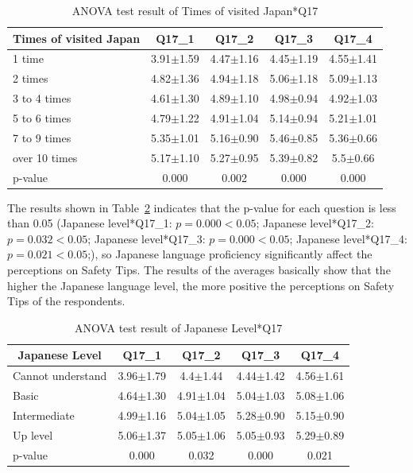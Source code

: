 \begin{table}[h]
  \caption{ANOVA test result of Times of visited Japan*Q17}
  \label{table32c}
  \centering
  \begin{tabular}{l|cccc}
 \hline
        \multicolumn{1}{c|}{Times of visited Japan}          & Q17\_1               & Q17\_2 & Q17\_3    & Q17\_4       \\
\hline
1 time        & 3.91$\pm$1.59 & 4.47$\pm$1.16   & 4.45$\pm$1.19   & 4.55$\pm$1.41 \\
2 times       & 4.82$\pm$1.36 & 4.94$\pm$1.18  & 5.06$\pm$1.18   & 5.09$\pm$1.13 \\
3 to 4 times  & 4.61$\pm$1.30 & 4.89$\pm$1.10 & 4.98$\pm$0.94 & 4.92$\pm$1.03  \\
5 to 6 times  & 4.79$\pm$1.22 & 4.91$\pm$1.04 & 5.14$\pm$0.94 & 5.21$\pm$1.01 \\
7 to 9 times  & 5.35$\pm$1.01 & 5.16$\pm$0.90 & 5.46$\pm$0.85 & 5.36$\pm$0.66 \\
over 10 times & 5.17$\pm$1.10& 5.27$\pm$0.95 & 5.39$\pm$0.82 & 5.5$\pm$0.66 \\           
\hline
p-value&           0.000&         0.002&         0.000&   0.000   \\
 \hline
  \end{tabular}
\end{table}


The results shown in Table~\ref{table32d} indicates that the p-value for each question is less than 0.05 (Japanese level*Q17\_1: $p=0.000<0.05$; Japanese level*Q17\_2: $p=0.032<0.05$; Japanese level*Q17\_3: $p=0.000<0.05$; Japanese level*Q17\_4: $p=0.021<0.05$;), so Japanese language proficiency significantly affect the perceptions on Safety Tips. The results of the averages basically show that the higher the Japanese language level, the more positive the perceptions on Safety Tips of the respondents. 



\begin{table}[h]
  \caption{ANOVA test result of Japanese Level*Q17}
  \label{table32d}
  \centering
  \begin{tabular}{l|cccc}
 \hline
        \multicolumn{1}{c|}{Japanese Level}          & Q17\_1               & Q17\_2 & Q17\_3    & Q17\_4        \\
\hline
Cannot understand & 3.96$\pm$1.79& 4.4$\pm$1.44 & 4.44$\pm$1.42 & 4.56$\pm$1.61 \\
Basic             & 4.64$\pm$1.30 & 4.91$\pm$1.04 & 5.04$\pm$1.03  & 5.08$\pm$1.06  \\
Intermediate      & 4.99$\pm$1.16 & 5.04$\pm$1.05 & 5.28$\pm$0.90 & 5.15$\pm$0.90  \\
Up level          & 5.06$\pm$1.37& 5.05$\pm$1.06 & 5.05$\pm$0.93 & 5.29$\pm$0.89 \\        
\hline
p-value&           0.000&         0.032&         0.000&   0.021   \\
 \hline
  \end{tabular}
\end{table}



